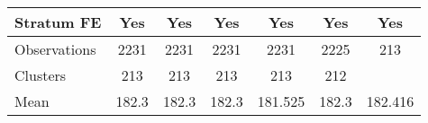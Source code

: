 {\begin{tabular}{l*{6}{c}}
Stratum FE      &      Yes         &      Yes         &      Yes         &      Yes         &      Yes         &      Yes         \\
\midrule
Observations    &     2231         &     2231         &     2231         &     2231         &     2225         &      213         \\
Clusters        &      213         &      213         &      213         &      213         &      212         &                  \\
Mean            &    182.3         &    182.3         &    182.3         &  181.525         &    182.3         &  182.416         \\
\bottomrule
\end{tabular}
}
